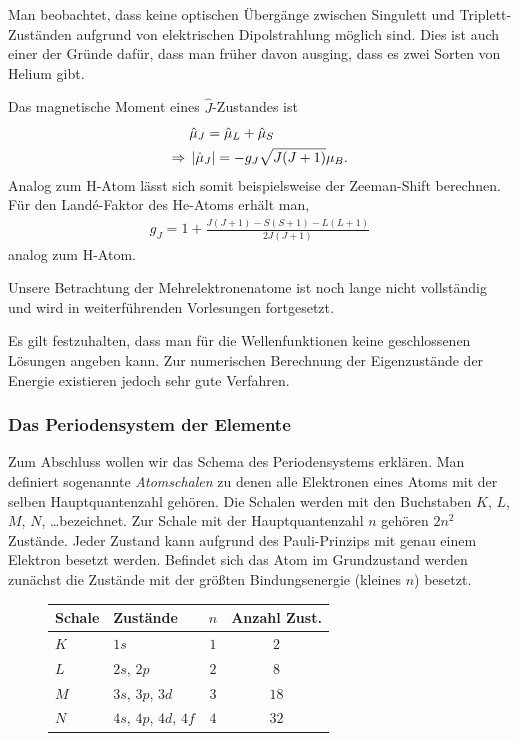 Man beobachtet, dass keine optischen Übergänge zwischen Singulett und
Triplett-Zuständen aufgrund von elektrischen Dipolstrahlung möglich sind. Dies
ist auch einer der Gründe dafür, dass man früher davon ausging, dass es zwei
Sorten von Helium gibt.

Das magnetische Moment eines $\hat{J}$-Zustandes ist
\begin{align*}
&\hat{\mu}_J = \hat{\mu}_L + \hat{\mu}_S\\
\Rightarrow\; &\left|\hat{\boldmath{\mu}}_J\right| = - g_J \sqrt{J(J+1)}\mu_B.
\end{align*}
Analog zum H-Atom lässt sich somit beispielsweise der Zeeman-Shift berechnen.
Für den Landé-Faktor des He-Atoms erhält man,
\begin{align*}
g_J = 1 + \frac{J(J+1)-S(S+1)-L(L+1)}{2J(J+1)}
\end{align*}
analog zum H-Atom.

Unsere Betrachtung der Mehrelektronenatome ist noch lange nicht vollständig und
wird in weiterführenden Vorlesungen fortgesetzt.

Es gilt festzuhalten, dass man für die Wellenfunktionen keine geschlossenen
Lösungen angeben kann. Zur numerischen Berechnung der Eigenzustände der Energie
existieren jedoch sehr gute Verfahren.

\subsubsection{Das Periodensystem der Elemente}

Zum Abschluss wollen wir das Schema des Periodensystems erklären. Man definiert
sogenannte \emph{Atomschalen} zu denen alle Elektronen eines Atoms mit der
selben Hauptquantenzahl gehören. Die Schalen werden mit den Buchstaben $K$,
$L$, $M$, $N$, \ldots bezeichnet. Zur Schale mit der Hauptquantenzahl $n$
gehören $2n^2$ Zustände. Jeder Zustand kann aufgrund des Pauli-Prinzips mit
genau einem Elektron besetzt werden. Befindet sich das Atom im Grundzustand
werden zunächst die Zustände mit der größten Bindungsenergie (kleines $n$)
besetzt.
\begin{figure}[!htbp]
\begin{tabular}{l|l|c|c}
Schale & Zustände & $n$ & Anzahl Zust.\\\hline
$K$ & $1s$ & $1$ & $2$\\
$L$ & $2s$, $2p$ & $2$ & $8$\\
$M$ & $3s$, $3p$, $3d$ & $3$ & $18$\\
$N$ & $4s$, $4p$, $4d$, $4f$  & $4$ & $32$
\end{tabular}
\end{figure}

